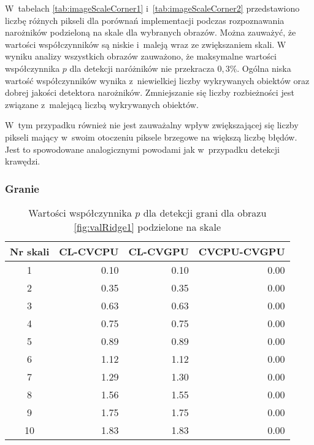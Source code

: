 W~tabelach \ref{tab:imageScaleCorner1} i~\ref{tab:imageScaleCorner2} przedstawiono liczbę różnych pikseli dla porównań implementacji podczas rozpoznawania narożników podzieloną na skale dla wybranych obrazów. Można zauważyć, że wartości współczynników są niskie i~maleją wraz ze zwiększaniem skali. W wyniku analizy wszystkich obrazów zauważono, że maksymalne wartości współczynnika $ p $ dla detekcji naróżników nie przekracza $ 0,3 \% $. Ogólna niska wartość współczynników wynika z~niewielkiej liczby wykrywanych obiektów oraz dobrej jakości detektora narożników. Zmniejszanie się liczby rozbieżności jest związane z~malejącą liczbą wykrywanych obiektów.

W~tym przypadku również nie jest zauważalny wpływ zwiększającej się liczby pikseli mający w~swoim otoczeniu piksele brzegowe na większą liczbę błędów. Jest to spowodowane analogicznymi powodami jak w~przypadku detekcji krawędzi.


\subsubsection{Granie}
\label{subsubsec:granieTabele}

\begin{center}
\begin{table}
\centering
\caption{Wartości współczynnika $ p $ dla detekcji grani dla obrazu \ref{fig:valRidge1} podzielone na skale}
\label{tab:imageScaleRidge1}
\begin{tabular}{|c|r|r|r|}
 \hline
Nr skali & CL-CVCPU & CL-CVGPU & CVCPU-CVGPU \\ \hline
1        & 0.10     & 0.10     & 0.00        \\ \hline
2        & 0.35     & 0.35     & 0.00        \\ \hline
3        & 0.63     & 0.63     & 0.00        \\ \hline
4        & 0.75     & 0.75     & 0.00        \\ \hline
5        & 0.89     & 0.89     & 0.00        \\ \hline
6        & 1.12     & 1.12     & 0.00        \\ \hline
7        & 1.29     & 1.30     & 0.00        \\ \hline
8        & 1.56     & 1.55     & 0.00        \\ \hline
9        & 1.75     & 1.75     & 0.00        \\ \hline
10       & 1.83     & 1.83     & 0.00        \\ \hline
\end{tabular}
\end{table}
\end{center}


